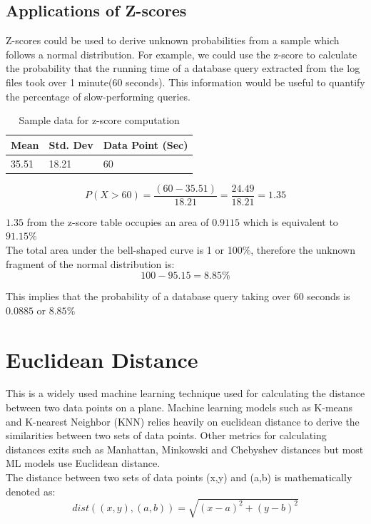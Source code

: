 \documentclass[12pt, letterpaper, titlepage]{report}
\begin{document}
\subsection{Applications of Z-scores}
Z-scores could be used to derive unknown probabilities from a sample which follows a normal distribution.
For example, we could use the z-score to calculate the probability that the running time of a database query extracted from the log files took over 1 minute(60 seconds). This information would be useful to quantify the percentage of slow-performing queries. \\
\begin{table}[h!]
	\centering
	
	
	\begin{tabular}{|l|l|l|}
		\hline
		\textbf{Mean} & \textbf{Std. Dev} & \textbf{Data Point (Sec)} \\ \hline
		35.51         & 18.21             & 60                        \\ \hline
	\end{tabular}
	\caption{Sample data for z-score computation}
	\label{sampleDataZscore}
\end{table}



$$
P(X>60) = \dfrac{(60-35.51)}{18.21}
        = \dfrac{24.49}{18.21} = 1.35
$$

$1.35$ from the z-score table occupies an area of $0.9115$ which is equivalent to $91.15\%$\\
The total area under the bell-shaped curve is 1 or 100\%, therefore the unknown fragment of the normal distribution is:\\
$$100 - 95.15 = 8.85\%$$

This implies that the probability of a database query taking over 60 seconds is $0.0885$ or $8.85\%$

\section{Euclidean Distance}
This is a widely used machine learning technique used for calculating the distance between two data points on a plane. Machine learning models such as K-means and K-nearest Neighbor (KNN) relies heavily on euclidean distance to derive the similarities between two sets of data points. Other metrics for calculating distances exits such as Manhattan, Minkowski and Chebyshev distances but most ML models use Euclidean distance.\\
The distance between two sets of data points (x,y) and (a,b) is mathematically denoted as:
$$ dist((x, y), (a, b)) = \sqrt{(x - a)^2 + (y - b)^2}$$
\end{document}
